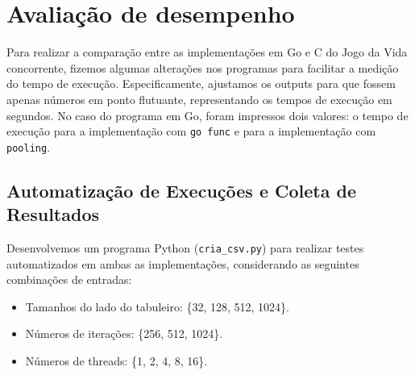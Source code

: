 \documentclass[14]{article}
\begin{document}






\section{ Avaliação de desempenho}

Para realizar a comparação entre as implementações em Go e C do Jogo da Vida concorrente, fizemos algumas alterações nos programas para facilitar a medição do tempo de execução. Especificamente, ajustamos os outputs para que fossem apenas números em ponto flutuante, representando os tempos de execução em segundos. No caso do programa em Go, foram impressos dois valores: o tempo de execução para a implementação com \texttt{go func} e para a implementação com \texttt{pooling}.

\subsection{Automatização de Execuções e Coleta de Resultados}

Desenvolvemos um programa Python (\texttt{cria\_csv.py}) para realizar testes automatizados em ambas as implementações, considerando as seguintes combinações de entradas:
\begin{itemize}
    \item Tamanhos do lado do tabuleiro: \{32, 128, 512, 1024\}.
    \item Números de iterações: \{256, 512, 1024\}.
    \item Números de threads: \{1, 2, 4, 8, 16\}.
\end{itemize}
\end{document}
